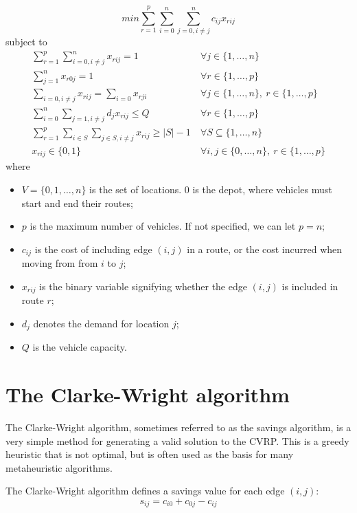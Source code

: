 \documentclass[12pt]{report}
\begin{document}
\begin{equation}
    min \sum_{r=1}^p \sum_{i=0}^n \sum_{j=0, i \neq j}^n c_{ij}x_{rij} \label{eq:form1}
\end{equation}
subject to
\begin{align}
    \sum_{r=1}^p \sum_{i=0,i \neq j}^n x_{rij} = 1 \ & \forall j \in \{1, \dots, n\} \label{eq:form2} \\
    \sum_{j=1}^n x_{r0j} = 1 \ & \forall r \in \{1,\dots,p\} \label{eq:form3} \\
    \sum_{i=0,i \neq j} x_{rij} = \sum_{i=0} x_{rji} \ & \forall j \in \{1, \dots, n\},\ r \in \{1,\dots,p\} \label{eq:form4} \\
    \sum_{i=0}^n \sum_{j=1,i \neq j} d_j x_{rij} \leq Q \ & \forall r \in \{1,\dots,p\} \label{eq:form5} \\
    \sum_{r=1}^p \sum_{i \in S} \sum_{j \in S, i \neq j} x_{rij} \geq |S| - 1 \ & \forall S \subseteq \{1,\dots,n\} \label{eq:form6} \\
    x_{rij} \in \{ 0, 1 \} \ & \forall i,j \in \{0, \dots, n\},\ r \in \{1,\dots,p\} \label{eq:form7}
\end{align}
where
\begin{itemize}
	\item $V = \{0, 1, \dots, n\}$ is the set of locations. $0$ is the depot, where vehicles must start and end their routes;
	\item $p$ is the maximum number of vehicles. If not specified, we can let $p = n$;
	\item $c_{ij}$ is the cost of including edge $(i, j)$ in a route, or the cost incurred when moving from from $i$ to $j$;
	\item $x_{rij}$ is the binary variable signifying whether the edge $(i,j)$ is included in route $r$;
	\item $d_j$ denotes the demand for location $j$;
	\item $Q$ is the vehicle capacity.
\end{itemize}

\section{The Clarke-Wright algorithm}
The Clarke-Wright algorithm, sometimes referred to as the savings algorithm, is a very simple method for generating a valid solution to the CVRP. This is a greedy heuristic that is not optimal, but is often used as the basis for many metaheuristic algorithms.

The Clarke-Wright algorithm defines a savings value for each edge $(i,j)$:
\[
	s_{ij} = c_{i0} + c_{0j} - c_{ij}
\]
\end{document}
